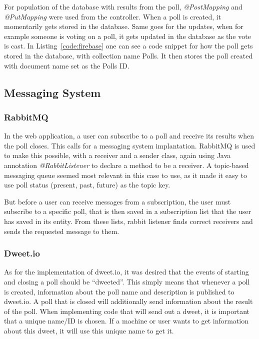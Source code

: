 For population of the database with results from the poll, \textit{@PostMapping} and \textit{@PutMapping} were used from the controller. When a poll is created, it momentarily gets stored in the database. Same goes for the updates, when for example someone is voting on a poll, it gets updated in the database as the vote is cast. In Listing~\ref{code:firebase} one can see a code snippet for how the poll gets stored in the database, with collection name Polls. It then stores the poll created with document name set as the Polls ID.

\subsection{Messaging System}\label{sub:messaging}
\subsubsection{RabbitMQ}
In the web application, a user can subscribe to a poll and receive its results when the poll closes. This calls for a messaging system implantation. RabbitMQ is used to make this possible, with a receiver and a sender class, again using Java annotation \textit{@RabbitListener} to declare a method to be a receiver. A topic-based messaging queue seemed most relevant in this case to use, as it made it easy to use poll status (present, past, future) as the topic key.

But before a user can receive messages from a subscription, the user must subscribe to a specific poll, that is then saved in a subscription list that the user has saved in its entity. From these lists, rabbit listener finds correct receivers and sends the requested message to them.
\subsubsection{Dweet.io}
As for the implementation of dweet.io, it was desired that the events of starting and closing a poll should be “dweeted”. This simply means that whenever a poll is created, information about the poll name and description is published to dweet.io. A poll that is closed will additionally send information about the result of the poll. When implementing code that will send out a dweet, it is important that a unique name/ID is chosen. If a machine or user wants to get information about this dweet, it will use this unique name to get it.

